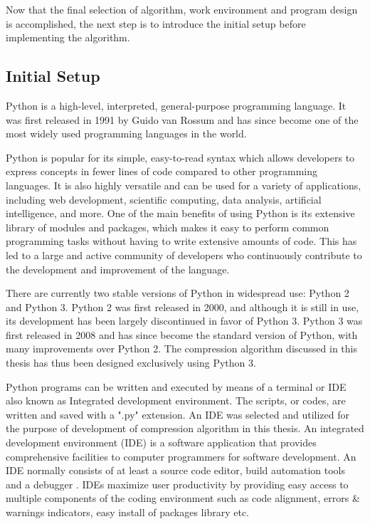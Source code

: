 Now that the final selection of algorithm, work environment and program design is accomplished, the next step is to introduce the initial setup before implementing the algorithm. 
\newpage

\subsection{Initial Setup}

Python is a high-level, interpreted, general-purpose programming language. It was first released in 1991 by Guido van Rossum and has since become one of the most widely used programming languages in the world.

Python is popular for its simple, easy-to-read syntax which allows developers to express concepts in fewer lines of code compared to other programming languages. It is also highly versatile and can be used for a variety of applications, including web development, scientific computing, data analysis, artificial intelligence, and more. One of the main benefits of using Python is its extensive library of modules and packages, which makes it easy to perform common programming tasks without having to write extensive amounts of code. This has led to a large and active community of developers who continuously contribute to the development and improvement of the language.

There are currently two stable versions of Python in widespread use: Python 2 and Python 3. Python 2 was first released in 2000, and although it is still in use, its development has been largely discontinued in favor of Python 3. Python 3 was first released in 2008 and has since become the standard version of Python, with many improvements over Python 2. The compression algorithm discussed in this thesis has thus been designed exclusively using Python 3. 

Python programs can be written and executed by means of a terminal or IDE also known as Integrated development environment. The scripts, or codes, are written and saved with a ".py" extension. An IDE was selected and utilized for the purpose of development of compression algorithm in this thesis. An integrated development environment (IDE) is a software application that provides comprehensive facilities to computer programmers for software development. An IDE normally consists of at least a source code editor, build automation tools and a debugger \cite{PyWiki}. IDEs maximize user productivity by providing easy access to multiple components of the coding environment such as code alignment, errors \& warnings indicators, easy install of packages library etc.   


